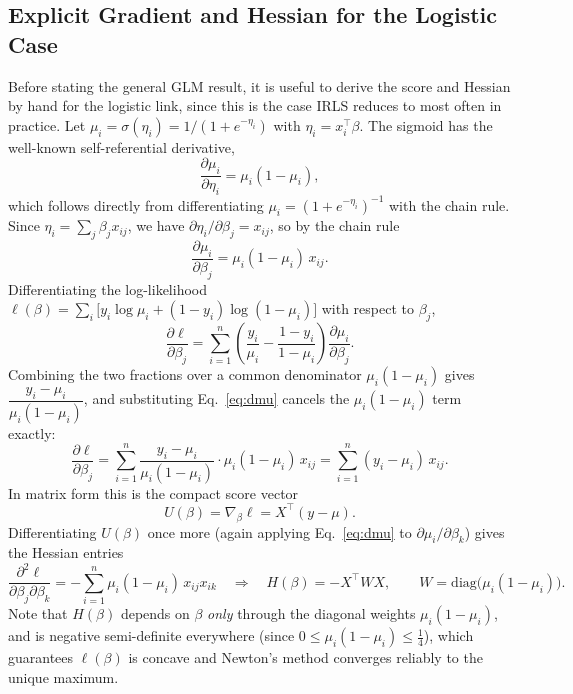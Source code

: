 \documentclass[a4paper,11pt]{article}
\begin{document}
\subsection{Explicit Gradient and Hessian for the Logistic Case}
Before stating the general GLM result, it is useful to derive the score and Hessian by hand for the logistic link, since this is the case IRLS reduces to most often in practice. Let $\mu_i = \sigma(\eta_i) = 1/(1+e^{-\eta_i})$ with $\eta_i = x_i^\top\beta$. The sigmoid has the well-known self-referential derivative,
\begin{equation}
\frac{\partial \mu_i}{\partial \eta_i} = \mu_i(1-\mu_i),
\end{equation}
which follows directly from differentiating $\mu_i=(1+e^{-\eta_i})^{-1}$ with the chain rule. Since $\eta_i = \sum_j \beta_j x_{ij}$, we have $\partial \eta_i/\partial \beta_j = x_{ij}$, so by the chain rule
\begin{equation}
\frac{\partial \mu_i}{\partial \beta_j} = \mu_i(1-\mu_i)\,x_{ij}.
\label{eq:dmu}
\end{equation}
Differentiating the log-likelihood $\ell(\beta)=\sum_i\big[y_i\log\mu_i+(1-y_i)\log(1-\mu_i)\big]$ with respect to $\beta_j$,
\begin{equation}
\frac{\partial \ell}{\partial \beta_j} = \sum_{i=1}^n \left(\frac{y_i}{\mu_i} - \frac{1-y_i}{1-\mu_i}\right)\frac{\partial \mu_i}{\partial\beta_j}.
\end{equation}
Combining the two fractions over a common denominator $\mu_i(1-\mu_i)$ gives $\dfrac{y_i - \mu_i}{\mu_i(1-\mu_i)}$, and substituting Eq.~\eqref{eq:dmu} cancels the $\mu_i(1-\mu_i)$ term exactly:
\begin{equation}
\frac{\partial \ell}{\partial \beta_j} = \sum_{i=1}^n \frac{y_i-\mu_i}{\mu_i(1-\mu_i)}\cdot \mu_i(1-\mu_i)\,x_{ij} = \sum_{i=1}^n (y_i-\mu_i)\,x_{ij}.
\end{equation}
In matrix form this is the compact score vector
\begin{equation}
U(\beta) = \nabla_\beta \ell = X^\top(y-\mu).
\label{eq:score_logit}
\end{equation}
Differentiating $U(\beta)$ once more (again applying Eq.~\eqref{eq:dmu} to $\partial\mu_i/\partial\beta_k$) gives the Hessian entries
\begin{equation}
\frac{\partial^2\ell}{\partial\beta_j\partial\beta_k} = -\sum_{i=1}^n \mu_i(1-\mu_i)\,x_{ij}x_{ik}
\quad\Longrightarrow\quad
H(\beta) = -X^\top W X, \qquad W=\mathrm{diag}\big(\mu_i(1-\mu_i)\big).
\label{eq:hess_logit}
\end{equation}
Note that $H(\beta)$ depends on $\beta$ \emph{only} through the diagonal weights $\mu_i(1-\mu_i)$, and is negative semi-definite everywhere (since $0\le\mu_i(1-\mu_i)\le \tfrac14$), which guarantees $\ell(\beta)$ is concave and Newton's method converges reliably to the unique maximum.
\end{document}
